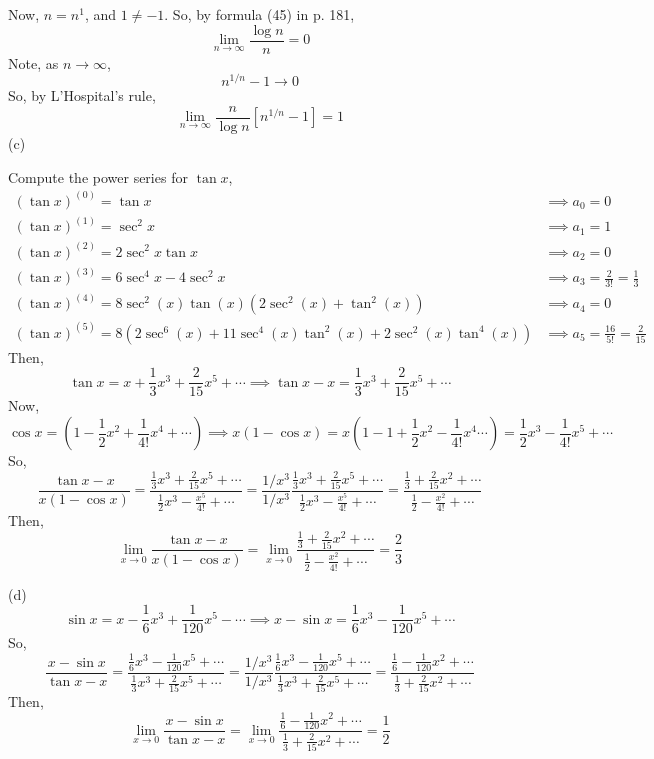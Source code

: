 \documentclass{article}
\begin{document}
Now, $n= n^1$, and $1\neq -1$. So, by formula (45) in
p. 181, \[\lim_{n\rightarrow \infty} \frac{\log{n}}{n} = 0\]
Note, as $n\rightarrow \infty$, \[n^{1/n} -1 \rightarrow 0\]
So, by L'Hospital's rule, \[\lim_{n\rightarrow \infty} \frac{n}{\log
    n}[n^{1/n}-1] = 1\]
(c)

Compute the power series for $\tan x$,
\begin{align*}
  (\tan x)^{(0)} = \tan x  &\implies  a_0 = 0 \\
  (\tan x)^{(1)} = \sec^2 x  &\implies a_1  = 1 \\
  (\tan x)^{(2)} = 2\sec^2 x \tan x &\implies a_2  = 0 \\
  (\tan x)^{(3)} = 6\sec^4 x -4\sec^2 x &\implies a_3  = \frac{2}{3!}
                                          = \frac{1}{3}\\
  (\tan x)^{(4)} = 8\sec^2(x) \tan(x) (2 \sec^2(x) + \tan^2(x))
                           &\implies a_4 =0\\
  (\tan x)^{(5)} = 8 (2 \sec^6(x) + 11 \sec^4(x) \tan^2(x) + 2
  \sec^2(x) \tan^4(x)) &\implies a_5 = \frac{16}{5!} = \frac{2}{15}
\end{align*}
Then, \[\tan x = x +\frac{1}{3}x^3 + \frac{2}{15}x^5 + \cdots \implies \tan{x} -x  =
  \frac{1}{3}x^3+  \frac{2}{15}x^5 +\cdots\]
  Now,\[\cos x = (1-\frac{1}{2}x^2+ \frac{1}{4!}x^4 +\cdots) \implies
  x(1-\cos x) = x(1-1 + \frac{1}{2}x^2 -\frac{1}{4!}x^4\cdots) = \frac{1}{2}x^3
  -\frac{1}{4!}x^5 + \cdots\]
So, \[\frac{\tan{x} -x}{x(1-\cos x)} = \frac{\frac{1}{3}x^3 +  \frac{2}{15}x^5 +\cdots}{\frac{1}{2}x^3
  -\frac{x^5}{4!} + \cdots}  = \frac{1/x^3}{1/x^3}\frac{\frac{1}{3}x^3 +  \frac{2}{15}x^5 +\cdots}{\frac{1}{2}x^3
  -\frac{x^5}{4!} + \cdots}   = \frac{\frac{1}{3} +  \frac{2}{15}x^2 +\cdots}{\frac{1}{2}
  -\frac{x^2}{4!} + \cdots}  \]
Then,
\[\lim_{x\rightarrow 0} \frac{\tan{x} -x}{x(1-\cos x)} =\lim_{x\rightarrow 0}
  \frac{\frac{1}{3} +  \frac{2}{15}x^2 +\cdots}{\frac{1}{2}
    -\frac{x^2}{4!} + \cdots}  = \frac{2}{3} \]

(d)
\[\sin x = x -\frac{1}{6}x^3+\frac{1}{120}x^5 - \cdots \implies x - \sin x =
  \frac{1}{6}x^3-\frac{1}{120}x^5 + \cdots\]
So, \[\frac{x-\sin x}{\tan x -x} =
  \frac{\frac{1}{6}x^3-\frac{1}{120}x^5 + \cdots}{\frac{1}{3}x^3 +
    \frac{2}{15}x^5 +\cdots} = \frac{1/x^3}{1/x^3}\frac{\frac{1}{6}x^3-\frac{1}{120}x^5 + \cdots}{\frac{1}{3}x^3 +
    \frac{2}{15}x^5 +\cdots}  = \frac{\frac{1}{6}-\frac{1}{120}x^2 + \cdots}{\frac{1}{3} +
    \frac{2}{15}x^2 +\cdots} \]
Then,\[\lim_{x\rightarrow 0} \frac{x-\sin x}{\tan x - x} =
  \lim_{x\rightarrow 0} \frac{\frac{1}{6}-\frac{1}{120}x^2 + \cdots}{\frac{1}{3} +
    \frac{2}{15}x^2 +\cdots} = \frac{1}{2}\]
\end{document}
